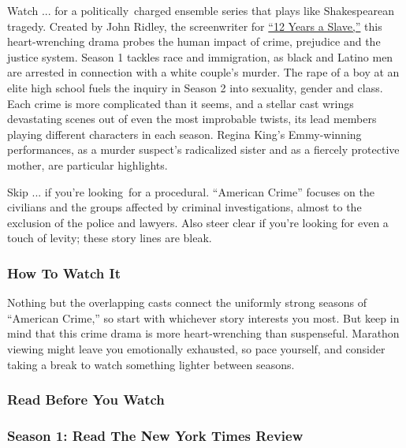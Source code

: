 Watch ... for a politically~charged ensemble series that plays like
Shakespearean tragedy. Created by John Ridley, the screenwriter for
\href{https://www.nytimes.com/watching/recommendations/watching-film-twelve-years-a-slave}{``12
Years a Slave,''} this heart-wrenching drama probes the human impact of
crime, prejudice and the justice system. Season 1 tackles race and
immigration, as black and Latino men are arrested in connection with a
white couple's murder. The rape of a boy at an elite high school fuels
the inquiry in Season 2 into sexuality, gender and class. Each crime is
more complicated than it seems, and a stellar cast wrings devastating
scenes out of even the most improbable twists, its lead members playing
different characters in each season. Regina King's Emmy-winning
performances, as a murder suspect's radicalized sister and as a fiercely
protective mother, are particular highlights.

Skip ... if you're looking~for a procedural. ``American Crime'' focuses
on the civilians and the groups affected by criminal investigations,
almost to the exclusion of the police and lawyers. Also steer clear if
you're looking for even a touch of levity; these story lines are bleak.

\hypertarget{how-to-watch-it}{%
\subsubsection{How To Watch It}\label{how-to-watch-it}}

Nothing but the overlapping casts connect the uniformly strong seasons
of ``American Crime,'' so start with whichever story interests you most.
But keep in mind that this crime drama is more heart-wrenching than
suspenseful. Marathon viewing might leave you emotionally exhausted, so
pace yourself, and consider taking a break to watch something lighter
between seasons.

\hypertarget{read-before-you-watch}{%
\subsubsection{Read Before You Watch}\label{read-before-you-watch}}

\href{https://www.nytimes.com/2015/03/05/arts/television/review-american-crime-a-series-where-justice-is-far-from-black-or-white.html}{}

\hypertarget{season-1-read-the-new-york-times-review}{%
\subsubsection{Season 1: Read The New York Times
Review}\label{season-1-read-the-new-york-times-review}}

